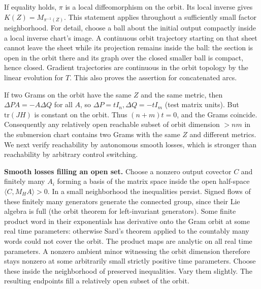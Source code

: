 \documentclass[10pt]{article}
\begin{document}
If equality holds, $\pi$ is a local diffeomorphism on the orbit. Its local inverse gives $K(Z)=M_{\pi^{-1}(Z)}$. This statement applies throughout a sufficiently small factor neighborhood. For detail, choose a ball about the initial output compactly inside a local inverse chart's image. A continuous orbit trajectory starting on that sheet cannot leave the sheet while its projection remains inside the ball: the section is open in the orbit there and its graph over the closed smaller ball is compact, hence closed. Gradient trajectories are continuous in the orbit topology by the linear evolution for $T$. This also proves the assertion for concatenated arcs.

If two Grams on the orbit have the same $Z$ and the same metric, then $\Delta P A=-A\Delta Q$ for all $A$, so $\Delta P=t I_n,\Delta Q=-t I_m$ (test matrix units). But $\mathrm{tr}(JH)$ is constant on the orbit. Thus $(n+m)t=0$, and the Grams coincide. Consequently any relatively open reachable subset of orbit dimension $>nm$ in the submersion chart contains two Grams with the same $Z$ and different metrics. We next verify reachability by autonomous smooth losses, which is stronger than reachability by arbitrary control switching.

\textbf{Smooth losses filling an open set.} Choose a nonzero output covector $C$ and finitely many $A_i$ forming a basis of the matrix space inside the open half-space $\langle C,M_H A\rangle>0$. In a small neighborhood the inequalities persist. Signed flows of these finitely many generators generate the connected group, since their Lie algebra is full (the orbit theorem for left-invariant generators). Some finite product word in their exponentials has derivative onto the Gram orbit at some real time parameters: otherwise Sard's theorem applied to the countably many words could not cover the orbit. The product maps are analytic on all real time parameters. A nonzero ambient minor witnessing the orbit dimension therefore stays nonzero at some arbitrarily small strictly positive time parameters. Choose these inside the neighborhood of preserved inequalities. Vary them slightly. The resulting endpoints fill a relatively open subset of the orbit.
\end{document}
